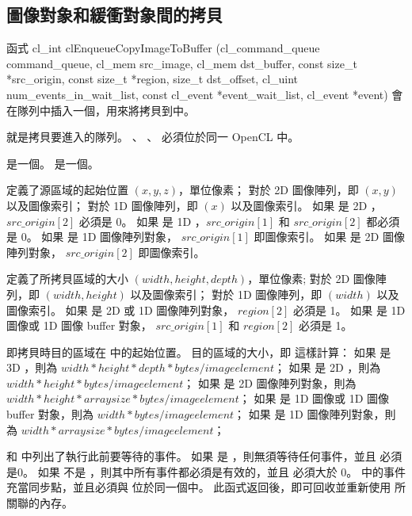 \subsection{圖像對象和緩衝對象間的拷貝}

函式
\startclc
cl_int clEnqueueCopyImageToBuffer (cl_command_queue command_queue,
			cl_mem src_image,
			cl_mem dst_buffer,
			const size_t *src_origin,
			const size_t *region,
			size_t dst_offset,
			cl_uint num_events_in_wait_list,
			const cl_event *event_wait_list,
			cl_event *event)
\stopclc
會在隊列中插入一個，用來將拷貝到中。

 就是拷貝要進入的隊列。
、 、  必須位於同一 OpenCL 中。

 是一個。
 是一個。

 定義了源區域的起始位置 $(x, y, z)$，單位像素；
對於 2D 圖像陣列，即 $(x, y)$ 以及圖像索引；
對於 1D 圖像陣列，即 $(x)$ 以及圖像索引。
如果  是 2D ， $src\_origin[2]$ 必須是 0。
如果  是 1D ，$src\_origin[1]$ 和 $src\_origin[2]$ 都必須是 0。
如果  是 1D 圖像陣列對象， $src\_origin[1]$ 即圖像索引。
如果  是 2D 圖像陣列對象， $src\_origin[2]$ 即圖像索引。

 定義了所拷貝區域的大小 $(width, height, depth)$，單位像素;
對於 2D 圖像陣列，即 $(width, height)$ 以及圖像索引；
對於 1D 圖像陣列，即 $(width)$ 以及圖像索引。
如果  是 2D  或 1D 圖像陣列對象， $region[2]$ 必須是 1。
如果  是 1D 圖像或 1D 圖像 buffer 對象， $src\_origin[1]$ 和 $region[2]$ 必須是 1。

 即拷貝時目的區域在  中的起始位置。
目的區域的大小，即  這樣計算：
如果  是 3D ，則為 $width * height * depth * bytes/image element$；
如果  是 2D ，則為 $width * height * bytes/image element$；
如果  是 2D 圖像陣列對象，則為 $width * height * arraysize * bytes/image element$；
如果  是 1D 圖像或 1D 圖像 buffer 對象，則為 $width * bytes/image element$；
如果  是 1D 圖像陣列對象，則為 $width * arraysize * bytes/image element$；

 和  中列出了執行此前要等待的事件。
如果  是 ，則無須等待任何事件，並且  必須是0。
如果  不是 ，則其中所有事件都必須是有效的，並且  必須大於 0。
 中的事件充當同步點，並且必須與  位於同一個中。
此函式返回後，即可回收並重新使用  所關聯的內存。


